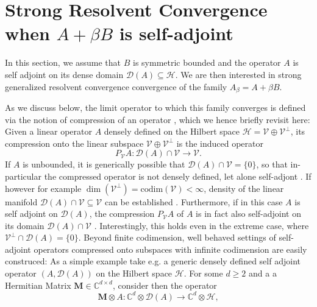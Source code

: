 \documentclass[reqno,12pt,letterpaper]{amsart}
\numberwithin{equation}{section}
\newcommand{\1}{\mathds{1}}
\theoremstyle{definition}
\begin{document}
	
	\section{Strong Resolvent Convergence when $A + \beta B$ is self-adjoint}\label{self_adjoint_section}
	

	
	In this section, we assume that $B$ is symmetric bounded and the operator $A$ is self adjoint on its dense domain $\mathcal{D}(A) \subseteq \mathcal{H}$. We are then interested in strong generalized resolvent convergence convergence of the family $A_\beta = A + \beta B$. 
	
	As we discuss below, the limit operator  to which this family converges is defined via the  notion of compression of an operator \cite{Stenger1968, Nudelman2011, Arlinskiy2025}, which we hence briefly revisit here: Given a linear operator $A$ densely defined on the Hilbert space $\mathscr{H} = \mathscr{V} \oplus  \mathscr{V}^{\perp} $, its compression onto the linear subspace $ \mathscr{V} \oplus  \mathscr{V}^{\perp} $ is the induced operator
	\begin{equation}
		P_{ \mathscr{V}} A : \mathcal{D}(A) \cap \mathscr{V} \longrightarrow  \mathscr{V}.
	\end{equation}
If $A$ is unbounded, it is generically possible that $  \mathcal{D}(A) \cap \mathscr{V}  = \{0\}$, so that in-particular the compressed operator is not densely defined, let alone self-adjont \cite{Arlinskiy2025}. If however for example  $\dim(\mathscr{V}^\perp) = \text{codim}(\mathscr{V}) < \infty$, density of the linear manifold $ \mathcal{D}(A) \cap \mathscr{V} \subseteq  \mathscr{V} $ can be established  \cite{GohbergKrein1957}. Furthermore, if in this case $A$ is self adjoint on $\mathcal{D}(A)$, the compression $P_{ \mathscr{V}} A $  of $A$ is in fact also  self-adjoint on  its domain  $\mathcal{D}(A) \cap \mathscr{V}$ \cite{Stenger1968}. Interestingly, this holds even in the extreme case, where $\mathscr{V}^\perp \cap \mathcal{D}(A) = \{0\}$.   
Beyond finite codimension, well behaved  settings of self-adjoint operators compressed onto subspaces with infinite codimension are easily construced: As a simple example take e.g.  a generic densely defined self adjoint operator $(A, \mathscr{D}(A))$ on the Hilbert space $\mathscr{H}$. For some $d \geq 2$ and a a Hermitian Matrix $\mathbf{M}\in \mathds{C}^{d \times d}$, consider then the operator
\begin{equation}
\mathbf{M} \otimes A: \mathds{C}^d \otimes \mathcal{D}(A) \longrightarrow \mathds{C}^d \otimes \mathscr{H},
\end{equation} 
\end{document}
